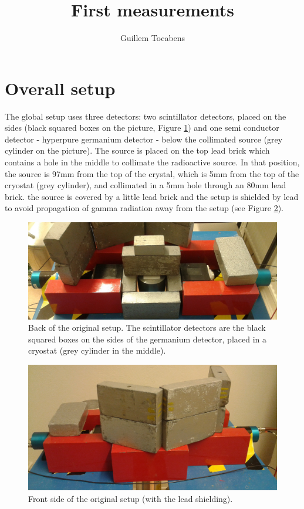 \documentclass[11pt,a4paper]{article}
\author{Guillem Tocabens}
\title{First measurements}
\begin{document}
\section{Overall setup}

The global setup uses three detectors: two scintillator detectors, placed on the sides (black squared boxes on the picture, Figure \ref{Setup}) and one semi conductor detector - hyperpure germanium detector - below the collimated source (grey cylinder on the picture). The source is placed on the top lead brick which contains a hole in the middle to collimate the radioactive source. In that position, the source is 97mm from the top of the crystal, which is 5mm from the top of the cryostat (grey cylinder), and collimated in a 5mm hole through an 80mm lead brick. the source is covered by a little lead brick and the setup is shielded by lead to avoid propagation of gamma radiation away from the setup (see Figure \ref{Setup_front}).

\begin{figure}[!h]
\centering
\includegraphics[scale=0.15]{New_setup_back.jpg}
\caption{Back of the original setup. The scintillator detectors are the black squared boxes on the sides of the germanium detector, placed in a cryostat (grey cylinder in the middle).}
\label{Setup}
\end{figure}

\begin{figure}[!h]
\centering
\includegraphics[scale=0.15]{New_setup_front.jpg}
\caption{Front side of the original setup (with the lead shielding).}
\label{Setup_front}
\end{figure}
\end{document}
